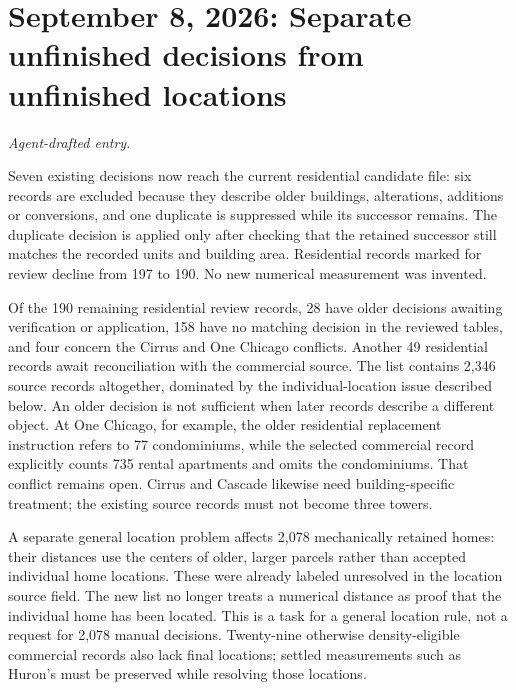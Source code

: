 \clearpage
\section*{September 8, 2026: Separate unfinished decisions from unfinished locations}
\textit{Agent-drafted entry.}

Seven existing decisions now reach the current residential candidate file: six records are excluded because they describe older buildings, alterations, additions or conversions, and one duplicate is suppressed while its successor remains. The duplicate decision is applied only after checking that the retained successor still matches the recorded units and building area. Residential records marked for review decline from 197 to 190. No new numerical measurement was invented.

Of the 190 remaining residential review records, 28 have older decisions awaiting verification or application, 158 have no matching decision in the reviewed tables, and four concern the Cirrus and One Chicago conflicts. Another 49 residential records await reconciliation with the commercial source. The list contains 2,346 source records altogether, dominated by the individual-location issue described below. An older decision is not sufficient when later records describe a different object. At One Chicago, for example, the older residential replacement instruction refers to 77 condominiums, while the selected commercial record explicitly counts 735 rental apartments and omits the condominiums. That conflict remains open. Cirrus and Cascade likewise need building-specific treatment; the existing source records must not become three towers.

A separate general location problem affects 2,078 mechanically retained homes: their distances use the centers of older, larger parcels rather than accepted individual home locations. These were already labeled unresolved in the location source field. The new list no longer treats a numerical distance as proof that the individual home has been located. This is a task for a general location rule, not a request for 2,078 manual decisions. Twenty-nine otherwise density-eligible commercial records also lack final locations; settled measurements such as Huron's must be preserved while resolving those locations.

